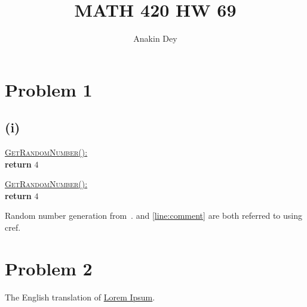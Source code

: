 \documentclass[letterpaper]{article}
\title{MATH 420 HW 69}
\author{Anakin Dey}
\begin{document}
\maketitle

\section*{Problem 1}
\subsection*{(i)}

\begin{algo}[1.3]
    \underline{\textsc{GetRandomNumber}():}\+
\\      \textbf{return} $4$   
\\      \hspace{39.00pt}
\end{algo}

\begin{nalgo}
                    \underline{\textsc{GetRandomNumber}():}\+
\\\label{line:ret}      \textbf{return} $4$   
\\\label{line:comment}  \hspace{39.00pt}
\end{nalgo}

Random number generation from~\cite{site:xkcd}.  and \cref{line:comment} are both referred to using cref.


\section*{Problem 2}
The English translation of \href{https://en.wikipedia.org/wiki/Lorem_ipsum#Source_text}{Lorem Ipsum}.
\end{document}
